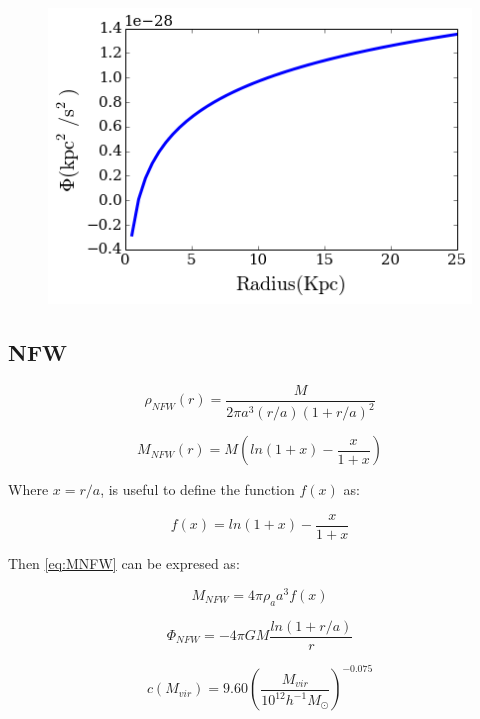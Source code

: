 \documentclass[a4paper, 12pt]{article} %
\begin{document}
\begin{figure}[H]
\centering
\includegraphics[scale=0.7]{sis_phi.png}
\end{figure}


\subsection{NFW}


\begin{equation}\label{eq:rhoNFW}
\rho_{NFW}(r) = \dfrac{M}{2\pi a^3(r/a) (1 + r/a)^2}
\end{equation}


\begin{equation}\label{eq:MNFW}
M_{NFW}(r) =  M  \left(  ln(1 + x) - \frac{x}{1 + x} \right)
\end{equation}

Where $x = r/a$, is useful to define the function $f(x)$ as:

\begin{equation}
f(x) = ln(1 + x) - \frac{x}{1 + x} 
\end{equation}

Then \ref{eq:MNFW} can be expresed as:

\begin{equation}\label{eq:M2NFW}
M_{NFW} = 4 \pi \rho_a a^3 f(x)
\end{equation}

\begin{equation}\label{PhiNFW}
\Phi_{NFW} = -4\pi G M \frac{ln(1 + r/a)}{r}
\end{equation}

\begin{equation}\label{eq:cnfwz0}
c(M_{vir}) = 9.60  \left( \frac{M_{vir}}{10^{12}h^{-1}M_{\odot}} \right)^{-0.075}
\end{equation}
\end{document}
